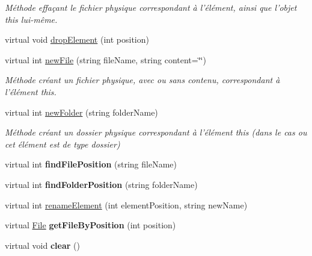 \begin{DoxyCompactItemize}
\begin{DoxyCompactList}\small\item\em Méthode effaçant le fichier physique correspondant à l'élément, ainsi que l'objet this lui-\/même. \item\end{DoxyCompactList}\item 
virtual void \hyperlink{class_folder_af3c7544c132e1773eb050fb1a5ba8072}{dropElement} (int position)
\item 
virtual int \hyperlink{class_folder_aeebb3b1a62077b9fdb5cd0c30b709358}{newFile} (string fileName, string content=\char`\"{}\char`\"{})
\begin{DoxyCompactList}\small\item\em Méthode créant un fichier physique, avec ou sans contenu, correspondant à l'élément this. \item\end{DoxyCompactList}\item 
virtual int \hyperlink{class_folder_aa32cbc33e9819ff11e6d9561da77a216}{newFolder} (string folderName)
\begin{DoxyCompactList}\small\item\em Méthode créant un dossier physique correspondant à l'élément this (dans le cas ou cet élément est de type dossier) \item\end{DoxyCompactList}\item 
\hypertarget{class_folder_a1782fdcb68e8da1974e4e0e1eb2b9747}{
virtual int {\bfseries findFilePosition} (string fileName)}
\label{class_folder_a1782fdcb68e8da1974e4e0e1eb2b9747}

\item 
\hypertarget{class_folder_a7ff05a1d1161f53e930d3dd8d3ad836f}{
virtual int {\bfseries findFolderPosition} (string folderName)}
\label{class_folder_a7ff05a1d1161f53e930d3dd8d3ad836f}

\item 
virtual int \hyperlink{class_folder_a5ed32bc216e9419d4f25bb2ff267c0f8}{renameElement} (int elementPosition, string newName)
\item 
\hypertarget{class_folder_a0ca795de032e21ad059eef1252ab4ee1}{
virtual \hyperlink{class_file}{File} {\bfseries getFileByPosition} (int position)}
\label{class_folder_a0ca795de032e21ad059eef1252ab4ee1}

\item 
\hypertarget{class_folder_a2f697ffa83443387bed62da6c350b382}{
virtual void {\bfseries clear} ()}
\label{class_folder_a2f697ffa83443387bed62da6c350b382}

\end{DoxyCompactItemize}
